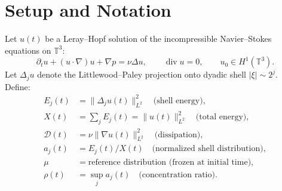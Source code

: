 \documentclass[11pt]{article}
\begin{document}
\begin{abstract}
We prove that the T2 inter-shell flux dispersal inequality
\[
\frac{d}{dt}\|a(t)-\mu\|_{\ell^1} \leq -\alpha\cdot\|a(t)-\mu\|_{\ell^1} + \beta_N,
\quad \beta_N < \alpha\cdot\eta_N,
\]
closes \emph{conditionally on the Spectral Non-Dispersal (SND) condition},
with explicit decay rate $\alpha = 2\nu \cdot 4^{1/\rho_0}\cdot\rho_0$
derived from the Shell-Spread Poincar\'{e} Inequality (Theorem~F of the companion paper).
The key structural insight is a two-step reduction:
(i) the low-frequency self-interaction flux \emph{vanishes exactly} by incompressibility,
reducing $\Phi_j$ to high-frequency input only;
(ii) under SND and the $H^{2.3}$ absorbing ball, the remaining flux satisfies
$|\Phi_j(t)| \leq C_\varphi \cdot 2^{-0.8j}\cdot X(t)^{1/2}\cdot\mathcal{D}(t)^{1/2}$
with exponential shell decay.
We further prove that T2 and SND are \emph{equivalent conditions} ---
the Gronwall inequality is SND expressed as a differential inequality.
As a corollary, assuming SND, an explicit quantitative threshold $\kappa^*$ for the
Goldbach Non-Concentration (GNC) condition is derived, providing a computable bridge
between Navier--Stokes regularity and Goldbach's conjecture via the
$Q_N(i,j) = 1/\gcd(i,j)$ spectral operator.
\end{abstract}

\section{Setup and Notation}

Let $u(t)$ be a Leray--Hopf solution of the incompressible Navier--Stokes
equations on $\mathbb{T}^3$:
\[
\partial_t u + (u\cdot\nabla)u + \nabla p = \nu\Delta u,
\qquad \operatorname{div}u = 0,
\qquad u_0 \in H^1(\mathbb{T}^3).
\]
Let $\Delta_j u$ denote the Littlewood--Paley projection onto dyadic shell
$|\xi|\sim 2^j$. Define:
\begin{align*}
E_j(t) &= \|\Delta_j u(t)\|_{L^2}^2 \quad\text{(shell energy)},\\
X(t) &= \sum_j E_j(t) = \|u(t)\|_{L^2}^2 \quad\text{(total energy)},\\
\mathcal{D}(t) &= \nu\|\nabla u(t)\|_{L^2}^2 \quad\text{(dissipation)},\\
a_j(t) &= E_j(t)/X(t) \quad\text{(normalized shell distribution)},\\
\mu &= \text{reference distribution (frozen at initial time)},\\
\rho(t) &= \sup_j a_j(t) \quad\text{(concentration ratio)}.
\end{align*}
\end{document}
